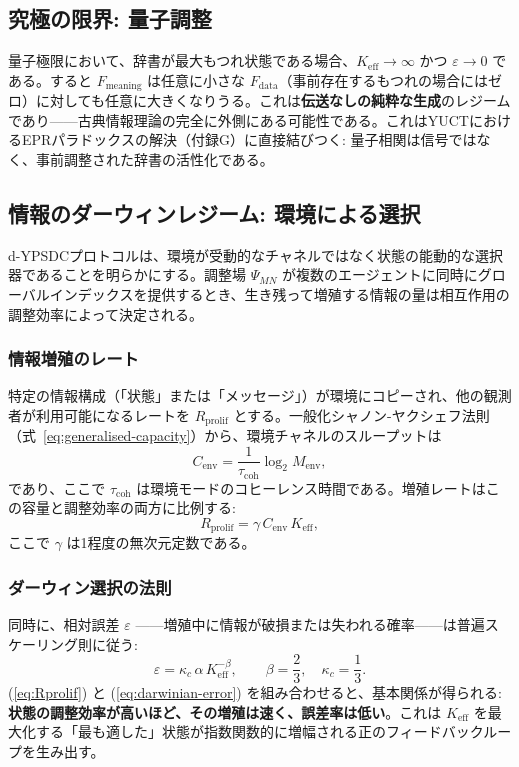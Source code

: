 \documentclass[12pt,a4paper]{article}
\theoremstyle{definition}
\theoremstyle{remark}
\newcommand{\Keff}{K_{\mathrm{eff}}}
\begin{document}
	\subsection{究極の限界: 量子調整}
	
	量子極限において、辞書が最大もつれ状態である場合、$\Keff \to \infty$ かつ $\varepsilon \to 0$ である。すると $F_{\text{meaning}}$ は任意に小さな $F_{\text{data}}$（事前存在するもつれの場合にはゼロ）に対しても任意に大きくなりうる。これは\textbf{伝送なしの純粋な生成}のレジームであり——古典情報理論の完全に外側にある可能性である。これはYUCTにおけるEPRパラドックスの解決（付録G）に直接結びつく: 量子相関は信号ではなく、事前調整された辞書の活性化である。
	
	\subsection{情報のダーウィンレジーム: 環境による選択}
	\label{subsec:darwinian-regime}
	
	d-YPSDCプロトコルは、環境が受動的なチャネルではなく状態の能動的な選択器であることを明らかにする。調整場 $\Psi_{MN}$ が複数のエージェントに同時にグローバルインデックスを提供するとき、生き残って増殖する情報の量は相互作用の調整効率によって決定される。
	
	\subsubsection*{情報増殖のレート}
	特定の情報構成（「状態」または「メッセージ」）が環境にコピーされ、他の観測者が利用可能になるレートを $R_{\mathrm{prolif}}$ とする。一般化シャノン-ヤクシェフ法則（式~\ref{eq:generalised-capacity}）から、環境チャネルのスループットは
	\[
	C_{\mathrm{env}} = \frac{1}{\tau_{\mathrm{coh}}} \log_2 M_{\mathrm{env}},
	\]
	であり、ここで $\tau_{\mathrm{coh}}$ は環境モードのコヒーレンス時間である。増殖レートはこの容量と調整効率の両方に比例する:
	\begin{equation}
		R_{\mathrm{prolif}} = \gamma \, C_{\mathrm{env}} \, K_{\mathrm{eff}},
		\label{eq:Rprolif}
	\end{equation}
	ここで $\gamma$ は1程度の無次元定数である。
	
	\subsubsection*{ダーウィン選択の法則}
	同時に、相対誤差 $\varepsilon$ ——増殖中に情報が破損または失われる確率——は普遍スケーリング則に従う:
	\begin{equation}
		\varepsilon = \kappa_c \, \alpha \, K_{\mathrm{eff}}^{-\beta},
		\qquad \beta = \frac{2}{3},\quad \kappa_c = \frac{1}{3}.
		\label{eq:darwinian-error}
	\end{equation}
	(\ref{eq:Rprolif}) と (\ref{eq:darwinian-error}) を組み合わせると、基本関係が得られる: \textbf{状態の調整効率が高いほど、その増殖は速く、誤差率は低い}。これは $K_{\mathrm{eff}}$ を最大化する「最も適した」状態が指数関数的に増幅される正のフィードバックループを生み出す。
	
\end{document}
